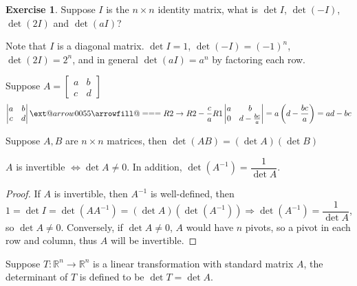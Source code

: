 \documentclass{beamer}
\makeatletter
\newcommand*{\Relbarfill@}{\arrowfill@\Relbar\Relbar\Relbar}
\newcommand*{\xequal}[2][]{\ext@arrow 0055\Relbarfill@{#1}{#2}}
\theoremstyle{definition}
\newtheorem{exercise}[theorem]{Exercise}
\theoremstyle{remark}
\makeatother
\begin{document}
\begin{frame}[t]
\begin{exercise}
Suppose $I$ is the $n\times n$ identity matrix, what is $\det I$, $\det(-I)$, $\det(2I)$ and $\det(aI)$?
\end{exercise}
\pause
\begin{solution}
Note that $I$ is a diagonal matrix. $\det I=1$, $\det(-I)=(-1)^n$, $\det(2I)=2^n$, and in general $\det (aI)=a^n$ by factoring each row.
\end{solution}
\pause
\begin{example}
Suppose $A=\begin{bmatrix}
a&b\\
c&d
\end{bmatrix}$\pause
\[
\left|\begin{matrix}
a&b\\
c&d
\end{matrix}\right|\xequal{R2\to R2-\frac{c}{a}R1}\left|\begin{matrix}
a&b\\
0&d-\frac{bc}{a}
\end{matrix}\right|=a\left(d-\frac{bc}{a}\right)=ad-bc
\]
\end{example}
\end{frame}

\begin{frame}[t]
\begin{theorem}
Suppose $A,B$ are $n\times n$ matrices, then $\det(AB)=(\det A)(\det B)$
\end{theorem}
\pause
\begin{theorem}
$A$ is invertible $\iff\det A\neq0$. In addition, $\det(A^{-1})=\dfrac{1}{\det A}$.
\end{theorem}
\pause
\begin{proof}
If $A$ is invertible, then $A^{-1}$ is well-defined, then $1=\det I=\det(AA^{-1})=(\det A)(\det(A^{-1}))\Rightarrow \det(A^{-1})=\dfrac{1}{\det A}$, so $\det A\neq0$. Conversely, if $\det A\neq0$, $A$ would have $n$ pivots, so a pivot in each row and column, thus $A$ will be invertible.
\end{proof}
\pause
\begin{definition}
Suppose $T:\mathbb R^n\to\mathbb R^n$ is a linear transformation with standard matrix $A$, the determinant of $T$ is defined to be $\det T=\det A$.
\end{definition}
\end{frame}
\end{document}
